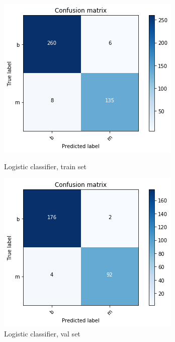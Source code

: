 \documentclass[11pt,a4paper]{article}
\begin{document}
\begin{figure}[H]\centering
	\begin{minipage}{0.49\linewidth}
		\includegraphics[width=\linewidth]{figures/conf_train_log.png}
		\caption{Logistic classifier, train set}\label{fig:conf_train_log}
	\end{minipage}
	\begin{minipage}{0.49\linewidth}
		\includegraphics[width=\linewidth]{figures/conf_val_log.png}
		\caption{Logistic classifier, val set}\label{fig:conf_val_log}
	\end{minipage}
\end{figure}	
\end{document}
